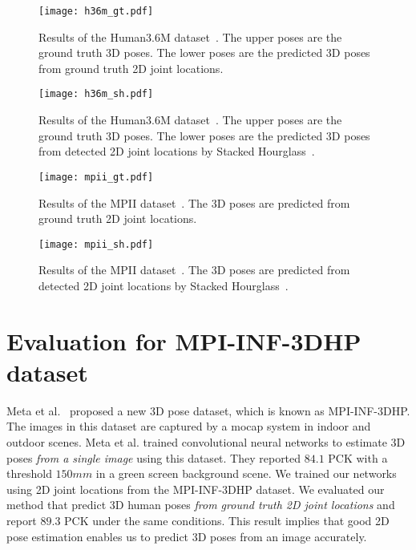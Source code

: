 \documentclass[runningheads]{llncs}
\begin{document}
\begin{figure}[tb]
  \begin{center}
    \texttt{[image: h36m\_gt.pdf]}
    \caption{
    Results of the Human3.6M dataset~\cite{S_h36m}.
    The upper poses are the ground truth 3D poses.
    The lower poses are the predicted 3D poses from ground truth 2D joint locations.
    }
    \label{h36m_gt}
  \end{center}
\end{figure}

\begin{figure}[tb]
  \begin{center}
    \texttt{[image: h36m\_sh.pdf]}
    \caption{
    Results of the Human3.6M dataset~\cite{S_h36m}.
    The upper poses are the ground truth 3D poses.
    The lower poses are the predicted 3D poses from detected 2D joint locations by Stacked Hourglass~\cite{S_newell}.
    }
    \label{h36m_sh}
  \end{center}
\end{figure}

\begin{figure}[tb]
  \begin{center}
    \texttt{[image: mpii\_gt.pdf]}
    \caption{
    Results of the MPII dataset~\cite{S_mpii}.
   	The 3D poses are predicted from ground truth 2D joint locations.
    }
    \label{mpii_gt}
  \end{center}
\end{figure}

\begin{figure}[tb]
  \begin{center}
    \texttt{[image: mpii\_sh.pdf]}
    \caption{
    Results of the MPII dataset~\cite{S_mpii}.
   	The 3D poses are predicted from detected 2D joint locations by Stacked Hourglass~\cite{S_newell}.
    }
    \label{mpii_sh}
  \end{center}
\end{figure}

\section{Evaluation for MPI-INF-3DHP dataset}
Meta et al.~\cite{S_mpi-inf} proposed a new 3D pose dataset, which is known as MPI-INF-3DHP.
The images in this dataset are captured by a mocap system in indoor and outdoor scenes.
Meta et al. trained convolutional neural networks to estimate 3D poses {\it from a single image} using this dataset.
They reported $84.1$ PCK with a threshold $150mm$ in a green screen background scene.
We trained our networks using 2D joint locations from the MPI-INF-3DHP dataset.
We evaluated our method that predict 3D human poses {\it from ground truth 2D joint locations} and report $89.3$ PCK under the same conditions.
This result implies that good 2D pose estimation enables us to predict 3D poses from an image accurately.
\end{document}
